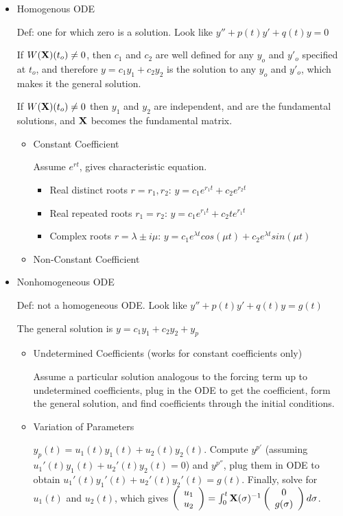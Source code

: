 \documentclass[a4paper,12pt]{article}
\begin{document}
		\begin{itemize}
		\item Homogenous ODE 
		
		Def: one for which zero is a solution. Look like $y''+p(t)y'+q(t)y=0$
		
		If $W(\bold{X})(t_o)\neq 0$, then $c_1$ and $c_2$ are well defined for any $y_o$ and $y'_o$ specified at $t_o$, and therefore $y=c_1y_1+c_2y_2$ is the solution to any $y_o$ and $y'_o$, which makes it the general solution.
		
		If $W(\bold{X})(t_o)\neq 0$ then $y_1$ and $y_2$ are independent, and are the fundamental solutions, and $\bold{X}$ becomes the fundamental matrix.
		
		
			\begin{itemize}
			\item Constant Coefficient
			
			Assume $e^{rt}$, gives characteristic equation.
				\begin{itemize}
				\item Real distinct roots $r=r_1,r_2$: $y=c_1e^{r_1t}+c_2e^{r_2t}$
				\item Real repeated roots $r_1=r_2$: $y=c_1e^{r_1t}+c_2te^{r_1t}$
				\item Complex roots $r=\lambda \pm i\mu$: $y=c_1e^{\lambda t}cos(\mu t) + c_2 e^{\lambda t} sin(\mu t)$
				\end{itemize}
			\item Non-Constant Coefficient
			\end{itemize}
		\item Nonhomogeneous ODE  
		
		Def: not a homogeneous ODE. Look like $y''+p(t)y'+q(t)y=g(t)$
		
		The general solution is $y=c_1y_1+c_2y_2+y_p$
			\begin{itemize}
			\item Undetermined Coefficients (works for constant coefficients only)
			
			Assume a particular solution analogous to the forcing term up to undetermined coefficients, plug in the ODE to get the coefficient, form the general solution, and find coefficients through the initial conditions.
			\item Variation of Parameters
			
			$y_p(t)=u_1(t)y_1(t)+u_2(t)y_2(t)$. Compute $y^{p'}$ (assuming $u_1'(t)y_1(t)+u_2'(t)y_2(t)=0$) and $y^{p''}$, plug them in ODE to obtain $u_1'(t)y_1'(t)+u_2'(t)y_2'(t)=g(t)$. Finally, solve for $u_1(t)$ and $u_2(t)$, which gives $\left( \begin{array}{c}
u_1  \\
u_2  \end{array} \right)=\int_0^t\bold{X}(\sigma)^{-1}\left( \begin{array}{c}
0  \\
g(\sigma)  \end{array} \right)d\sigma $.
			\end{itemize}
		\end{itemize}
\end{document}
